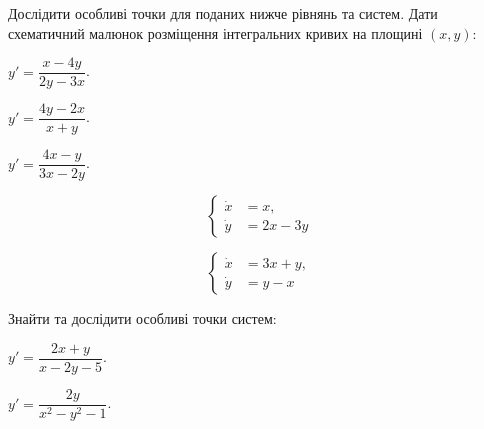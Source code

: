 Дослідити особливі точки для поданих нижче рівнянь та систем. Дати схематичний малюнок розміщення інтегральних кривих на площині $(x, y)$:

\begin{problem}
	$y' = \dfrac{x - 4 y}{2 y - 3 x}$.
\end{problem}

\begin{problem}
	$y' = \dfrac{4 y - 2 x}{x + y}$.
\end{problem}

\begin{problem}
	$y' = \dfrac{4 x - y}{3 x - 2 y}$.
\end{problem}

\begin{problem}
	\[\left\{ \begin{aligned} \dot x &= x, \\ \dot y &= 2 x - 3 y \end{aligned} \right.\]
\end{problem}

\begin{problem}
	\[\left\{ \begin{aligned} \dot x &= 3 x + y, \\ \dot y &= y - x \end{aligned} \right.\]
\end{problem}

Знайти та дослідити особливі точки систем:

\begin{problem}
	$y' = \dfrac{2 x + y}{x - 2 y - 5}$.
\end{problem}

\begin{problem}
	$y' = \dfrac{2 y}{x^2 - y^2 - 1}$.
\end{problem}
